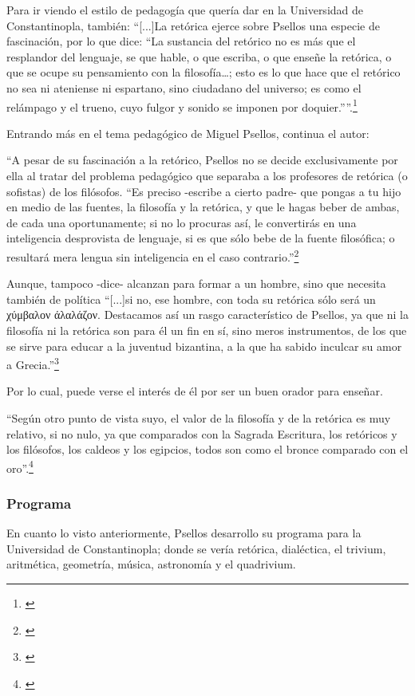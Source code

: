 	Para ir viendo el estilo de pedagogía que quería dar en la Universidad de Constantinopla, también: “[...]La retórica ejerce sobre Psellos una especie de fascinación, por lo que dice: “La sustancia del retórico no es más que el resplandor del lenguaje, se que hable, o que escriba, o que enseñe la retórica, o que se ocupe su pensamiento con la filosofía…; esto es lo que hace que el retórico no sea ni ateniense ni espartano, sino ciudadano del universo; es como el relámpago y el trueno, cuyo fulgor y sonido se imponen por doquier.””.\footnote{\cite[p.~161]{filosofia}}

	Entrando más en el tema pedagógico de Miguel Psellos, continua el autor:

	“A pesar de su fascinación a la retórico, Psellos no se decide exclusivamente por ella al tratar del problema pedagógico que separaba a los profesores de retórica (o sofistas) de los filósofos. “Es preciso -escribe a cierto padre- que pongas a tu hijo en medio de las fuentes, la filosofía y la retórica, y que le hagas beber de ambas, de cada una oportunamente; si no lo procuras así, le convertirás en una inteligencia desprovista de lenguaje, si es que sólo bebe de la fuente filosófica; o resultará mera lengua sin inteligencia en el caso contrario.”\footnote{\cite[p.~161]{filosofia}}

	Aunque, tampoco -dice- alcanzan para formar a un hombre, sino que necesita también de política “[...]si no, ese hombre, con toda su retórica sólo será un 
	χύμβαλον άλαλάζον.
	 Destacamos así un rasgo característico de Psellos, ya que ni la filosofía ni la retórica son para él un fin en sí, sino meros instrumentos, de los que se sirve para educar a la juventud bizantina, a la que ha sabido inculcar su amor a Grecia.”\footnote{\cite[p.~161]{filosofia}}

	Por lo cual, puede verse el interés de él por ser un buen orador para enseñar.

	“Según otro punto de vista suyo, el valor de la filosofía y de la retórica es muy relativo, si no nulo, ya que comparados con la Sagrada Escritura, los retóricos y los filósofos, los caldeos y los egipcios, todos son como el bronce comparado con el oro”.\footnote{\cite[p.~161]{filosofia}}

\subsubsection{Programa}
	En cuanto lo visto anteriormente, Psellos desarrollo su programa para la Universidad de Constantinopla; donde se vería retórica, dialéctica, el trivium, aritmética, geometría, música, astronomía y el quadrivium.

